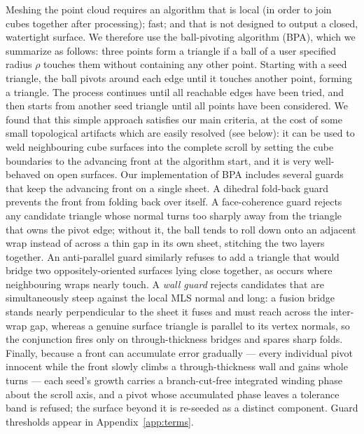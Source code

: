 Meshing the point cloud requires an algorithm that is local (in order to join cubes together after processing); fast; and that is not designed to output a closed, watertight surface. We therefore use the ball-pivoting algorithm \cite{bernardini1999ball} (BPA), which we summarize as follows: three points form a triangle if a ball of a user specified radius $\rho$ touches them without containing any other point. Starting with a seed triangle, the ball pivots around each edge until it touches another point, forming a triangle. The process continues until all reachable edges have been tried, and then starts from another seed triangle until all points have been considered. We found that this simple approach satisfies our main criteria, at the cost of some small topological artifacts which are easily resolved (see below): it can be used to weld neighbouring cube surfaces into the complete scroll by setting the cube boundaries to the advancing front at the algorithm start, and it is very well-behaved on open surfaces. Our implementation of BPA includes several guards that keep the advancing front on a single sheet. A dihedral fold-back guard prevents the front from folding back over itself. A face-coherence guard rejects any candidate triangle whose normal turns too sharply away from the triangle that owns the pivot edge; without it, the ball tends to roll down onto an adjacent wrap instead of across a thin gap in its own sheet, stitching the two layers together. An anti-parallel guard similarly refuses to add a triangle that would bridge two oppositely-oriented surfaces lying close together, as occurs where neighbouring wraps nearly touch. A {\em wall guard} rejects candidates that are simultaneously steep against the local MLS normal and long: a fusion bridge stands nearly perpendicular to the sheet it fuses and must reach across the inter-wrap gap, whereas a genuine surface triangle is parallel to its vertex normals, so the conjunction fires only on through-thickness bridges and spares sharp folds. Finally, because a front can accumulate error gradually --- every individual pivot innocent while the front slowly climbs a through-thickness wall and gains whole turns --- each seed's growth carries a branch-cut-free integrated winding phase about the scroll axis, and a pivot whose accumulated phase leaves a tolerance band is refused; the surface beyond it is re-seeded as a distinct component. Guard thresholds appear in Appendix~\ref{app:terms}.

